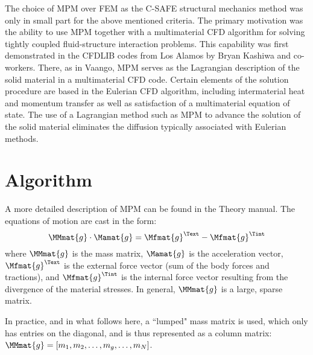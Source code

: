 The choice of MPM over FEM as the C-SAFE structural mechanics method
was only in small part for the above mentioned criteria.  The
primary motivation was the ability to use MPM together with a multimaterial
CFD algorithm for solving tightly coupled fluid-structure interaction
problems.  This capability was first demonstrated in the CFDLIB
codes from Los Alamos by Bryan Kashiwa and co-workers.  There, as
in Vaango, MPM serves as the Lagrangian description of the solid
material in a multimaterial CFD code.  Certain elements of the
solution procedure are based in the Eulerian CFD algorithm, including
intermaterial heat and momentum transfer as well as satisfaction
of a multimaterial equation of state.  The use of a Lagrangian method
such as MPM to advance the solution of the solid material eliminates
the diffusion typically associated with Eulerian methods.

\section{Algorithm}
A more detailed description of MPM can be found in the
\Vaango Theory manual. The equations of motion are 
cast in the form:
\begin{equation}
  \MMmat{g} \cdot \Mamat{g} = \Mfmat{g}^\Text - \Mfmat{g}^\Tint  
\label{newton2}
\end{equation}
where $\MMmat{g}$ is the mass matrix, $\Mamat{g}$ is the 
acceleration vector, $\Mfmat{g}^\Text$ is the external force vector 
(sum of the body forces and tractions), and $\Mfmat{g}^\Tint$ is the 
internal force vector resulting from the divergence of the material 
stresses.  In general, $\MMmat{g}$ is a large, sparse matrix.  

\begin{NoteBox}
In practice, 
and in what follows here, a ``lumped" mass matrix is used, which only has 
entries on the diagonal, and is thus represented as a column matrix:
$\MMmat{g} = [m_1, m_2, \dots, m_g, \dots, m_N]$.
\end{NoteBox}

